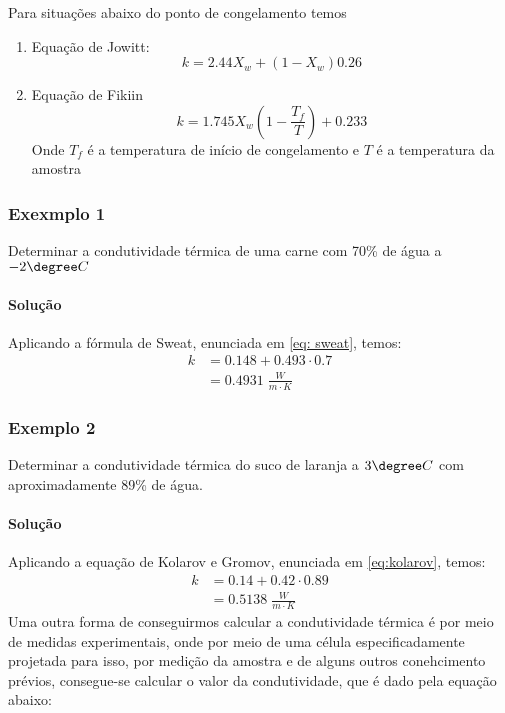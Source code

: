 Para situações abaixo do ponto de congelamento temos
\begin{enumerate}
    \item {Equação de Jowitt:
        \begin{equation}\label{eq:jowitt}
            k = 2.44X_{w} + \left( 1 - X_{w}  \right) 0.26
        \end{equation}}
        \item {Equação de Fikiin
            \begin{equation}\label{eq:fikiin}
                k = 1.745X_{w} \left( 1 - \frac{T_{f} }{T} \right) + 0.233
            \end{equation}
            Onde \(T_{f} \) é a temperatura de início de congelamento e \(T\) é a temperatura da amostra}
\end{enumerate}  
\subsubsection{Exexmplo 1}
Determinar a condutividade térmica de uma carne com 70\% de água a \(-2 \degree C\)
\paragraph{Solução}
Aplicando a fórmula de Sweat, enunciada em \ref{eq: sweat}, temos:
\begin{align*}
    k &= 0.148 + 0.493 \cdot  0.7\\ 
    &= 0.4931 \; \frac{W}{m \cdot K}
\end{align*}
\subsubsection{Exemplo 2}
Determinar a condutividade térmica do suco de laranja a \(3 \degree C\) com aproximadamente 89\% de
água.
\paragraph{Solução}
Aplicando a equação de Kolarov e Gromov, enunciada em \ref{eq:kolarov}, temos:
\begin{align*}
    k &= 0.14 + 0.42 \cdot  0.89\\
    &= 0.5138 \; \frac{W}{m \cdot K}
\end{align*}
Uma outra forma de conseguirmos calcular a condutividade térmica é por meio de medidas
experimentais, onde por meio de uma célula especificadamente projetada para isso, por medição da
amostra e de alguns outros conehcimento prévios, consegue-se calcular o valor da condutividade, que
é dado pela equação abaixo:

